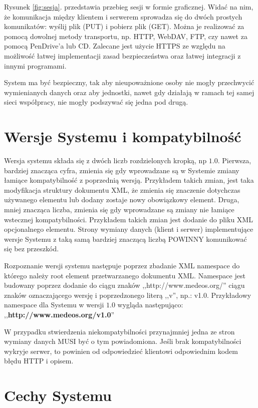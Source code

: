 \documentclass[a4paper]{article}
\begin{document}
Rysunek \ref{fig:sesja}. przedstawia przebieg sesji w formie graficznej. Widać
na nim, że komunikacja między klientem i serwerem sprowadza się do dwóch
prostych komunikatów: wyślij plik (PUT) i pobierz plik (GET). Można je
realizować za pomocą dowolnej metody transportu, np. HTTP, WebDAV, FTP, czy
nawet za pomocą PenDrive'a lub CD. Zalecane jest użycie HTTPS ze względu na
możliwość łatwej implementacji zasad bezpieczeństwa oraz łatwej integracji z innymi
programami.

System ma być bezpieczny, tak aby nieupoważnione osoby nie mogły przechwycić
wymienianych danych oraz aby jednostki, nawet gdy działają w ramach
tej samej sieci współpracy, nie mogły podszywać się jedna pod drugą. 

\section{Wersje Systemu i kompatybilność}

Wersja systemu składa się z dwóch liczb rozdzielonych kropką, np $1.0$. Pierwsza, bardziej
znacząca cyfra, zmienia się gdy wprowadzane są w Systemie zmiany łamiące kompatybilność z
poprzednią wersją. Przykładem takich zmian, jest taka modyfikacja struktury dokumentu XML,
że zmienia się znaczenie dotychczas używanego elementu lub dodany zostaje nowy obowiązkowy
element. Druga, mniej znacząca liczba, zmienia się gdy wprowadzane są zmiany nie łamiące
wstecznej kompatybilności. Przykładem takich zmian jest dodanie do pliku XML opcjonalnego elementu.
Strony wymiany danych (klient i serwer) implementujące wersje Systemu z taką samą bardziej
znaczącą liczbą POWINNY komunikować się bez przeszkód.

Rozpoznanie wersji systemu następuje poprzez zbadanie XML namespace do którego należy root
element przetwarzanego dokumentu XML. Namespace jest budowany poprzez dodanie do ciągu
znaków ,,http://www.medeos.org/'' ciągu znaków oznaczającego wersję i poprzedzonego literą
,,v'', np.: v1.0. Przykładowy namespace dla Systemu w wersji $1.0$ wygląda następująco:
,,\textbf{http://www.medeos.org/v1.0}''

W przypadku stwierdzenia niekompatybilności przynajmniej jedna ze stron wymiany danych
MUSI być o tym powiadomiona. Jeśli brak kompatybilności wykryje serwer, to powinien od
odpowiedzieć klientowi odpowiednim kodem błędu HTTP i opisem. 

\section{Cechy Systemu}
\end{document}
